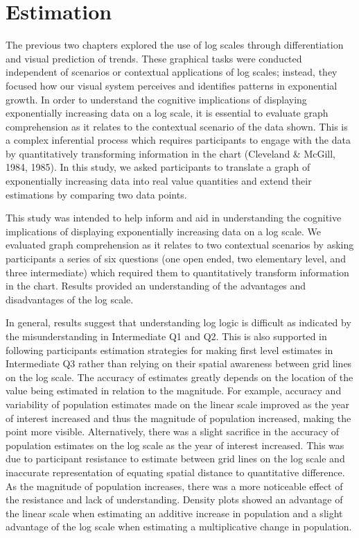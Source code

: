 \documentclass[print]{nuthesis}
\begin{document}
\hypertarget{estimation-1}{%
\section{Estimation}\label{estimation-1}}

The previous two chapters explored the use of log scales through differentiation and visual prediction of trends.
These graphical tasks were conducted independent of scenarios or contextual applications of log scales; instead, they focused how our visual system perceives and identifies patterns in exponential growth.
In order to understand the cognitive implications of displaying exponentially increasing data on a log scale, it is essential to evaluate graph comprehension as it relates to the contextual scenario of the data shown.
This is a complex inferential process which requires participants to engage with the data by quantitatively transforming information in the chart (Cleveland \& McGill, 1984, 1985).
In this study, we asked participants to translate a graph of exponentially increasing data into real value quantities and extend their estimations by comparing two data points.

This study was intended to help inform and aid in understanding the cognitive implications of displaying exponentially increasing data on a log scale.
We evaluated graph comprehension as it relates to two contextual scenarios by asking participants a series of six questions (one open ended, two elementary level, and three intermediate) which required them to quantitatively transform information in the chart.
Results provided an understanding of the advantages and disadvantages of the log scale.

In general, results suggest that understanding log logic is difficult as indicated by the misunderstanding in Intermediate Q1 and Q2.
This is also supported in following participants estimation strategies for making first level estimates in Intermediate Q3 rather than relying on their spatial awareness between grid lines on the log scale.
The accuracy of estimates greatly depends on the location of the value being estimated in relation to the magnitude.
For example, accuracy and variability of population estimates made on the linear scale improved as the year of interest increased and thus the magnitude of population increased, making the point more visible.
Alternatively, there was a slight sacrifice in the accuracy of population estimates on the log scale as the year of interest increased.
This was due to participant resistance to estimate between grid lines on the log scale and inaccurate representation of equating spatial distance to quantitative difference.
As the magnitude of population increases, there was a more noticeable effect of the resistance and lack of understanding.
Density plots showed an advantage of the linear scale when estimating an additive increase in population and a slight advantage of the log scale when estimating a multiplicative change in population.
\end{document}
